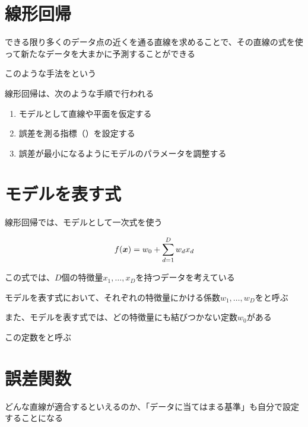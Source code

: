 \documentclass[../../../topic_machine-learning]{subfiles}
\begin{document}
\sectionline
\section{線形回帰}

できる限り多くのデータ点の近くを通る直線を求めることで、その直線の式を使って新たなデータを大まかに予測することができる

このような手法をという

\br

線形回帰は、次のような手順で行われる

\begin{enumerate}
  \item モデルとして直線や平面を仮定する
  \item 誤差を測る指標（）を設定する
  \item 誤差が最小になるようにモデルのパラメータを調整する
\end{enumerate}

\sectionline
\section{モデルを表す式}

線形回帰では、モデルとして一次式を使う

\begin{equation*}
  f(\vb*{x}) = w_0 + \sum_{d=1}^{D} w_d x_d
\end{equation*}

この式では、$D$個の特徴量$x_1,\ldots,x_D$を持つデータを考えている

\br

モデルを表す式において、それぞれの特徴量にかける係数$w_1,\ldots,w_D$をと呼ぶ

\br

また、モデルを表す式では、どの特徴量にも結びつかない定数$w_0$がある

この定数をと呼ぶ

\sectionline
\section{誤差関数}

どんな直線が適合するといえるのか、「データに当てはまる基準」も自分で設定することになる
\end{document}
